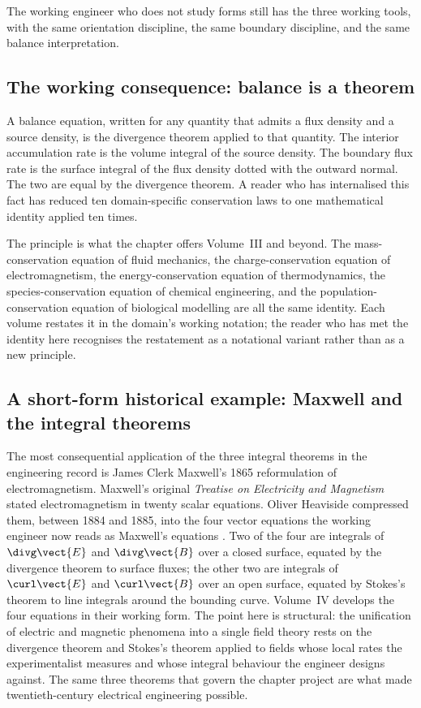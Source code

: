 \noindent
The working engineer who does not study forms still has the three
working tools, with the same orientation discipline, the same
boundary discipline, and the same balance interpretation.

\subsection{The working consequence: balance is a theorem}

\begin{principle}
A balance equation, written for any quantity that admits a flux
density and a source density, is the divergence theorem applied to
that quantity. The interior accumulation rate is the volume integral
of the source density. The boundary flux rate is the surface integral
of the flux density dotted with the outward normal. The two are
equal by the divergence theorem. A reader who has internalised this
fact has reduced ten domain-specific conservation laws to one
mathematical identity applied ten times.
\end{principle}

The principle is what the chapter offers Volume~III and beyond. The
mass-conservation equation of fluid mechanics, the charge-conservation
equation of electromagnetism, the energy-conservation equation of
thermodynamics, the species-conservation equation of chemical
engineering, and the population-conservation equation of biological
modelling are all the same identity. Each volume restates it in the
domain's working notation; the reader who has met the identity here
recognises the restatement as a notational variant rather than as a
new principle.

\subsection{A short-form historical example: Maxwell and the integral
theorems}

The most consequential application of the three integral theorems in
the engineering record is James Clerk Maxwell's 1865 reformulation of
electromagnetism. Maxwell's original \textit{Treatise on Electricity
and Magnetism} stated electromagnetism in twenty scalar equations.
Oliver Heaviside compressed them, between 1884 and 1885, into the
four vector equations the working engineer now reads as Maxwell's
equations \cite{text:v2ch08-griffiths-em-2017}. Two of the four are
integrals of $\divg\vect{E}$ and $\divg\vect{B}$ over a closed
surface, equated by the divergence theorem to surface fluxes; the
other two are integrals of $\curl\vect{E}$ and $\curl\vect{B}$ over
an open surface, equated by Stokes's theorem to line integrals around
the bounding curve. Volume~IV develops the four equations in their
working form. The point here is structural: the unification of
electric and magnetic phenomena into a single field theory rests on
the divergence theorem and Stokes's theorem applied to fields whose
local rates the experimentalist measures and whose integral
behaviour the engineer designs against. The same three theorems
that govern the chapter project are what made twentieth-century
electrical engineering possible.

